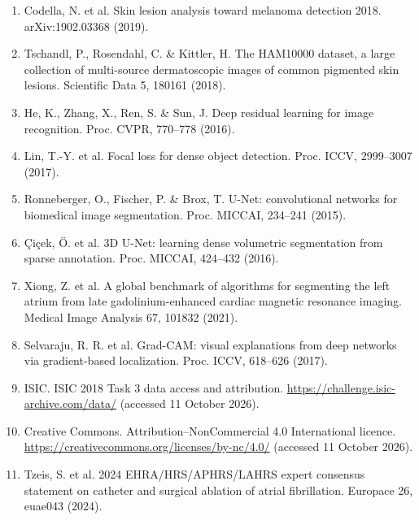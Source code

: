 \documentclass[11pt,a4paper]{article}
\begin{document}
\begin{enumerate}[label=\arabic*.,leftmargin=6mm,itemsep=2mm]\small

\item Codella, N. et al. Skin lesion analysis toward melanoma detection 2018. arXiv:1902.03368 (2019).

\item Tschandl, P., Rosendahl, C. \& Kittler, H. The HAM10000 dataset, a large collection of multi-source dermatoscopic images of common pigmented skin lesions. Scientific Data 5, 180161 (2018).

\item He, K., Zhang, X., Ren, S. \& Sun, J. Deep residual learning for image recognition. Proc. CVPR, 770–778 (2016).

\item Lin, T.-Y. et al. Focal loss for dense object detection. Proc. ICCV, 2999–3007 (2017).

\item Ronneberger, O., Fischer, P. \& Brox, T. U-Net: convolutional networks for biomedical image segmentation. Proc. MICCAI, 234–241 (2015).

\item Çiçek, Ö. et al. 3D U-Net: learning dense volumetric segmentation from sparse annotation. Proc. MICCAI, 424–432 (2016).

\item Xiong, Z. et al. A global benchmark of algorithms for segmenting the left atrium from late gadolinium-enhanced cardiac magnetic resonance imaging. Medical Image Analysis 67, 101832 (2021).

\item Selvaraju, R. R. et al. Grad-CAM: visual explanations from deep networks via gradient-based localization. Proc. ICCV, 618–626 (2017).

\item ISIC. ISIC 2018 Task 3 data access and attribution. \url{https://challenge.isic-archive.com/data/} (accessed 11 October 2026).

\item Creative Commons. Attribution–NonCommercial 4.0 International licence. \url{https://creativecommons.org/licenses/by-nc/4.0/} (accessed 11 October 2026).

\item Tzeis, S. et al. 2024 EHRA/HRS/APHRS/LAHRS expert consensus statement on catheter and surgical ablation of atrial fibrillation. Europace 26, euae043 (2024).


\end{enumerate}
\end{document}
